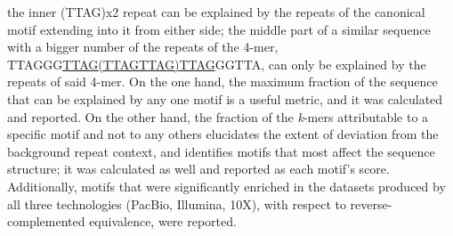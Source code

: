 \documentclass{article}
\begin{document}
            the inner (TTAG)x2 repeat can be explained by the repeats of the canonical motif extending into it from either side;
            the middle part of a similar sequence with a bigger number of the repeats of the 4-mer, TTAGGG\underline{TTAG(TTAGTTAG)TTAG}GGTTA,
                can only be explained by the repeats of said 4-mer.
        On the one hand, the maximum fraction of the sequence that can be explained by any one motif is a useful metric,
            and it was calculated and reported.
        On the other hand, the fraction of the \textit{k}-mers attributable to a specific motif \textendash{} and not to any others \textendash{}
            elucidates the extent of deviation from the background repeat context,
            and identifies motifs that most affect the sequence structure;
            it was calculated as well and reported as each motif's score.
    Additionally, motifs that were significantly enriched in the datasets produced by all three technologies (PacBio, Illumina, 10X),
        with respect to reverse-complemented equivalence, were reported.
\end{document}
